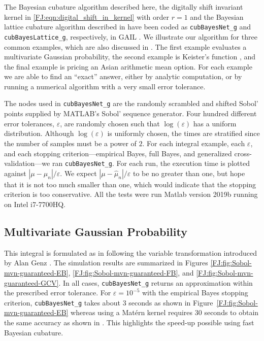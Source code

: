 \documentclass[graybox,footinfo]{svmult}
\newcommand{\abs}[1]{\left\lvert #1 \right\rvert} %
\begin{document}
\label{FJ:sec:NumExp}


The Bayesian cubature algorithm described here, the digitally shift invariant kernel in \eqref{FJ:eqn:digital_shift_in_kernel} with order $r=1$  and the Bayesian lattice cubature algorithm described in \cite{RatHic19a} have been coded as  \texttt{cubBayesNet\_g} and \texttt{cubBayesLattice\_g}, respectively, in GAIL \cite{ChoEtal21a}.  We illustrate our algorithm for three common examples, which are also discussed in \cite{RatHic19a}.  The first example evaluates a multivariate Gaussian probability, the second example is Keister's function \cite{Kei96}, and the final example is pricing an Asian arithmetic mean option.  For each example we are able to find an ``exact'' answer, either by analytic computation, or by running a numerical algorithm with a very small error tolerance.

The nodes used in \texttt{cubBayesNet\_g} are the randomly scrambled and shifted Sobol' points supplied by MATLAB's Sobol' sequence generator. Four hundred different error tolerances, $\varepsilon$, are randomly chosen such that $\log(\varepsilon)$ has a uniform distribution.   Although $\log(\varepsilon)$ is uniformly chosen, the times are stratified since the number of samples must be a power of $2$.
For each integral example, each $\varepsilon$, and each stopping criterion---empirical Bayes, full Bayes, and generalized cross-validation---we ran \texttt{cubBayesNet\_g}.  For each run, the execution time is plotted against $\abs{\mu - \widehat{\mu}_n}/\varepsilon$.  We expect $\abs{\mu - \widehat{\mu}_n}/\varepsilon$ to be no greater than one, but hope that it is not too much smaller than one, which would indicate that the stopping criterion  is too conservative.
All the tests were run Matlab version 2019b running on Intel i7-7700HQ.

\subsection{Multivariate Gaussian Probability}

This integral is formulated as in \cite{RatHic19a} following the variable transformation introduced by Alan Genz \cite{Gen92}. The simulation results are summarized in Figures \ref{FJ:fig:Sobol-mvn-guaranteed-EB}, \ref{FJ:fig:Sobol-mvn-guaranteed-FB}, and \ref{FJ:fig:Sobol-mvn-guaranteed-GCV}.  In all cases, \texttt{cubBayesNet\_g} returns an approximation within the prescribed error tolerance. For  $\varepsilon=10^{-5}$ with the empirical Bayes stopping criterion, \texttt{cubBayesNet\_g} takes about 3 seconds as shown in Figure~\ref{FJ:fig:Sobol-mvn-guaranteed-EB} whereas using a Mat\'ern kernel requires 30 seconds to obtain the same accuracy as shown in \cite{RatHic19a}. This highlights the speed-up possible using fast Bayesian cubature.
\end{document}
